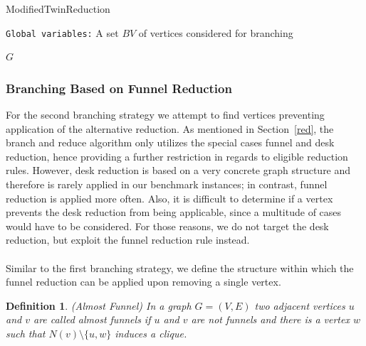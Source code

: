 \documentclass[12pt,a4paper,twoside]{scrartcl}
\newtheorem{definition}{Definition}
\numberwithin{equation}{section}
\let\oldnl\nl%
\newcommand{\nonl}{\renewcommand{\nl}{\let\nl\oldnl}}%
\begin{document}
\begin{algorithm}[htb]
	\caption{ModifiedTwinReduction}\label{alg:alm_twins}
	\DontPrintSemicolon
	\nonl\texttt{Global variables:} A set $BV$ of vertices considered for branching\\
	
	\U{$G$}	
	
	
\end{algorithm}

\subsubsection{Branching Based on Funnel Reduction}
For the second branching strategy we attempt to find vertices preventing application of the alternative reduction. As mentioned in Section~\ref{red}, the branch and reduce algorithm only utilizes the special cases funnel and desk reduction, hence providing a further restriction in regards to eligible reduction rules. However, desk reduction is based on a very concrete graph structure and therefore is rarely applied in our benchmark instances; in contrast, funnel reduction is applied more often. Also, it is difficult to determine if a vertex prevents the desk reduction from being applicable, since a multitude of cases would have to be considered.
For those reasons, we do not target the desk reduction, but exploit the funnel reduction rule instead.
\paragraph{}
Similar to the first branching strategy, we define the structure within which the funnel reduction can be applied upon removing a single vertex.
\begin{definition}(Almost Funnel)
	In a graph $G=(V,E)$ two adjacent vertices $u$ and $v$ are called almost funnels if $u$ and $v$ are not funnels and there is a vertex $w$ such that $N(v)\setminus\{u,w\}$ induces a clique.
\end{definition}
\end{document}
